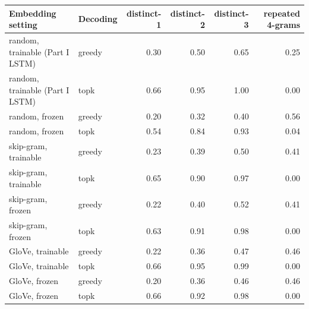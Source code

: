 \begin{tabular}{@{}llrrrr@{}}
\toprule
Embedding setting & Decoding & distinct-1 & distinct-2 & distinct-3 & repeated 4-grams \\
\midrule
random, trainable (Part I LSTM) & greedy & 0.30 & 0.50 & 0.65 & 0.25 \\
random, trainable (Part I LSTM) & topk & 0.66 & 0.95 & 1.00 & 0.00 \\
random, frozen & greedy & 0.20 & 0.32 & 0.40 & 0.56 \\
random, frozen & topk & 0.54 & 0.84 & 0.93 & 0.04 \\
skip-gram, trainable & greedy & 0.23 & 0.39 & 0.50 & 0.41 \\
skip-gram, trainable & topk & 0.65 & 0.90 & 0.97 & 0.00 \\
skip-gram, frozen & greedy & 0.22 & 0.40 & 0.52 & 0.41 \\
skip-gram, frozen & topk & 0.63 & 0.91 & 0.98 & 0.00 \\
GloVe, trainable & greedy & 0.22 & 0.36 & 0.47 & 0.46 \\
GloVe, trainable & topk & 0.66 & 0.95 & 0.99 & 0.00 \\
GloVe, frozen & greedy & 0.20 & 0.36 & 0.46 & 0.46 \\
GloVe, frozen & topk & 0.66 & 0.92 & 0.98 & 0.00 \\
\bottomrule
\end{tabular}